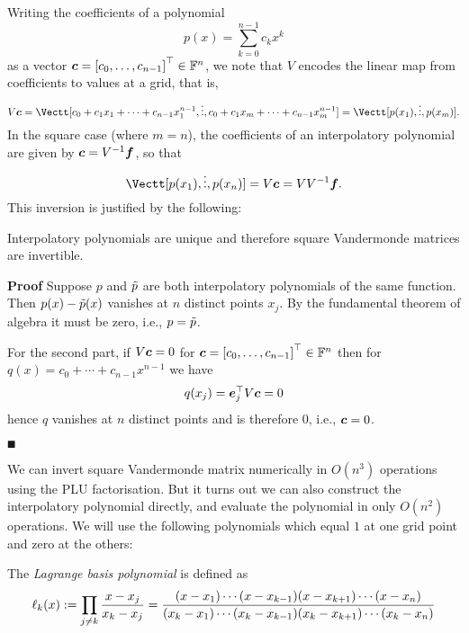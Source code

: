 Writing the coefficients of a polynomial
\[
p(x) = \ensuremath{\sum}_{k=0}^{n-1} c_k x^k
\]
as a vector  $\ensuremath{\bm{\c}} = \vectt[c_0,\ensuremath{\ldots},c_{n-1}] \ensuremath{\in} \ensuremath{\bbF}^n$, we note that $V$ encodes the linear map from coefficients to values at a grid, that is,
\[
V\ensuremath{\bm{\c}} = \Vectt[c_0 + c_1 x_1 + \ensuremath{\cdots} + c_{n-1} x_1^{n-1}, \ensuremath{\vdots}, c_0 + c_1 x_m + \ensuremath{\cdots} + c_{n-1} x_m^{n-1}] = \Vectt[p(x_1),\ensuremath{\vdots},p(x_m)].
\]
In the square case (where $m=n$), the coefficients of an interpolatory polynomial are given by $\bm{{\mbox{\boldmath$c$\unboldmath}}} = V^{-1} \bm{{\mbox{\boldmath$f$\unboldmath}}}$, so that
\[
\Vectt[p(x_1),\ensuremath{\vdots},p(x_n)] = V \ensuremath{\bm{\c}} = V V^{-1} \ensuremath{\bm{\f}}.
\]
This inversion is justified by the following:

\begin{proposition} Interpolatory polynomials are unique and therefore square Vandermonde matrices are invertible.

\end{proposition}
\textbf{Proof} Suppose $p$ and ${\tilde p}$ are both interpolatory polynomials of the same function. Then $p(x) - {\tilde p}(x)$ vanishes at $n$ distinct points $x_j$. By the fundamental theorem of algebra it must be zero, i.e., $p = {\tilde p}$.

For the second part, if $V \bm{{\mbox{\boldmath$c$\unboldmath}}} = 0$ for $\ensuremath{\bm{\c}} = \vectt[c_0,\ensuremath{\ldots},c_{n-1}] \ensuremath{\in} \ensuremath{\bbF}^n$ then for $q(x) = c_0 + \ensuremath{\cdots} + c_{n-1} x^{n-1}$ we have
\[
q(x_j) = \bm{{\mbox{\boldmath$e$\unboldmath}}}_j^\top V \bm{{\mbox{\boldmath$c$\unboldmath}}} = 0
\]
hence $q$ vanishes at $n$ distinct points and is therefore 0, i.e., $\bm{{\mbox{\boldmath$c$\unboldmath}}} = 0$.

\ensuremath{\QED}

We can invert square Vandermonde matrix numerically in $O(n^3)$ operations using the PLU factorisation. But it turns out we can also construct the interpolatory polynomial directly, and evaluate the polynomial in only $O(n^2)$ operations. We will use the following polynomials which equal $1$ at one grid point and zero at the others:

\begin{definition} The \emph{Lagrange basis polynomial} is defined as
\[
\ensuremath{\ell}_k(x) := \ensuremath{\prod}_{j \ensuremath{\neq} k} {x-x_j \over x_k - x_j} =  {(x-x_1) \ensuremath{\cdots}(x-x_{k-1})(x-x_{k+1}) \ensuremath{\cdots} (x-x_n) \over (x_k - x_1) \ensuremath{\cdots} (x_k - x_{k-1}) (x_k - x_{k+1}) \ensuremath{\cdots} (x_k - x_n)}
\]
\end{definition}

